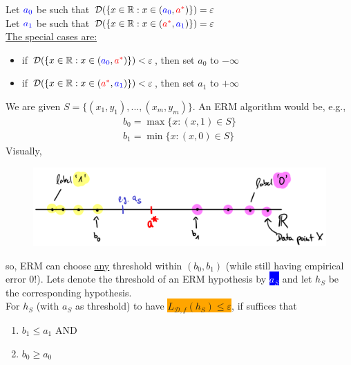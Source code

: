 \documentclass[10pt,a4paper]{article}
\theoremstyle{definition}
\theoremstyle{plain}
\begin{document}
Let $\textcolor{blue}{a_0}$ be such that $\mathcal{D}(\{x\in \mathbb{R}: x \in (\textcolor{blue}{a_0}, \textcolor{red}{a^*})\}) = \varepsilon$\\
Let $\textcolor{blue}{a_1}$ be such that $\mathcal{D}(\{x\in \mathbb{R}: x \in (\textcolor{red}{a^*}, \textcolor{blue}{a_1})\}) = \varepsilon$\\
\underline{The special cases are:}
\begin{itemize}
	\item if $\mathcal{D}(\{x\in \mathbb{R}: x \in (\textcolor{blue}{a_0}, \textcolor{red}{a^*})\}) < \varepsilon$, then set $a_0$ to $-\infty$
	\item if $\mathcal{D}(\{x\in \mathbb{R}: x \in (\textcolor{red}{a^*}, \textcolor{blue}{a_1})\}) < \varepsilon$, then set $a_1$ to $+\infty$
\end{itemize}
We are given $S = \{(x_1, y_1), ..., (x_m, y_m)\}$. An ERM algorithm would be, e.g., 
\begin{align*}
	b_0 = \max \{x: (x,1) \in S \}\\
	b_1 = \min \{x: (x,0) \in S \}
\end{align*}
Visually,\\
\begin{figure}[H]
	\centering
	\includegraphics[width=0.9\linewidth]{sketch_5}
	\label{fig:sketch5}
\end{figure}

so, ERM can choose \underline{any} threshold within $(b_0, b_1)$ (while still having empirical error 0!). Lets denote the threshold of an ERM hypothesis by \colorbox{blue}{\textcolor{white}{$a_S$}} and let $h_S$ be the corresponding hypothesis.\\
For $h_S$ (with $a_S$ as threshold) to have \colorbox{orange}{$L_{\mathcal{D}, f}(h_S) \leq \varepsilon$}, if suffices that
\begin{enumerate}
	\item $b_1 \leq a_1$ AND
	\item $b_0 \geq a_0$
\end{enumerate}
\end{document}
